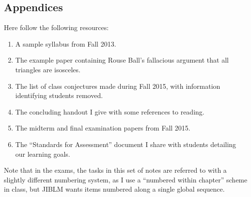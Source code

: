 \begin{annotation}
\chapter{Appendices}

Here follow the following resources:
\begin{enumerate}
\item A sample syllabus from Fall 2013.
\item The example paper containing Rouse Ball's fallacious argument that all triangles are isosceles.\cite{ball}
\item The list of class conjectures made during Fall 2015, with information identifying students removed.
\item The concluding handout I give with some references to reading.
\item The midterm and final examination papers from Fall 2015.
\item The ``Standards for Assessment'' document I share with students detailing our learning goals.
\end{enumerate}

Note that in the exams, the tasks in this set of notes are referred to with a slightly different numbering system, as I use a ``numbered within chapter'' scheme in class, but JIBLM wants items numbered along a single global sequence.













\end{annotation}


